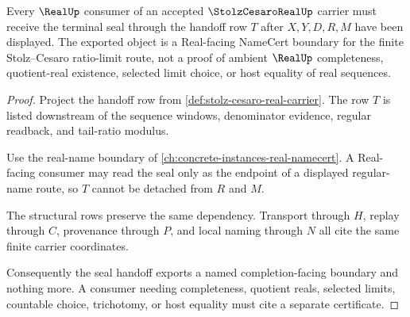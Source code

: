 \begin{theorem}
\label{thm:stolz-cesaro-real-seal-handoff}
Every $\RealUp$ consumer of an accepted $\StolzCesaroRealUp$ carrier must receive the terminal seal through the handoff row $T$ after $X,Y,D,R,M$ have been displayed. The exported object is a Real-facing NameCert boundary for the finite Stolz--Cesaro ratio-limit route, not a proof of ambient $\RealUp$ completeness, quotient-real existence, selected limit choice, or host equality of real sequences.
\end{theorem}
\begin{proof}
Project the handoff row from \autoref{def:stolz-cesaro-real-carrier}. The row $T$ is listed downstream of the sequence windows, denominator evidence, regular readback, and tail-ratio modulus.

Use the real-name boundary of \autoref{ch:concrete-instances-real-namecert}. A Real-facing consumer may read the seal only as the endpoint of a displayed regular-name route, so $T$ cannot be detached from $R$ and $M$.

The structural rows preserve the same dependency. Transport through $H$, replay through $C$, provenance through $P$, and local naming through $N$ all cite the same finite carrier coordinates.

Consequently the seal handoff exports a named completion-facing boundary and nothing more. A consumer needing completeness, quotient reals, selected limits, countable choice, trichotomy, or host equality must cite a separate certificate.
\end{proof}


\begin{closurestatus}{\StolzCesaroRealUp}
  \theoryclosure{\seedClosure}
  \formalstatus{\unformalizedV}
\end{closurestatus}
